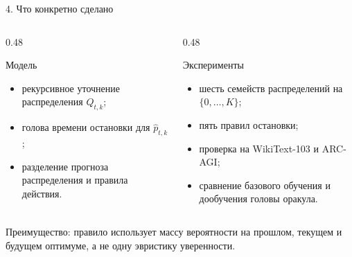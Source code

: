 \documentclass[aspectratio=169,11pt]{beamer}
\newcommand{\smallnote}[1]{{\color{mutedText}\small #1}}
\begin{document}
\begin{frame}{4. Что конкретно сделано}
\begin{columns}[T,onlytextwidth]
\begin{column}{0.48\textwidth}
\begin{block}{Модель}
\begin{itemize}\setlength\itemsep{1.5mm}
\item рекурсивное уточнение распределения $Q_{t,k}$;
\item голова времени остановки для $\widehat p_{t,k}$;
\item разделение прогноза распределения и правила действия.
\end{itemize}
\end{block}
\end{column}
\begin{column}{0.48\textwidth}
\begin{block}{Эксперименты}
\begin{itemize}\setlength\itemsep{1.5mm}
\item шесть семейств распределений на $\{0,\ldots,K\}$;
\item пять правил остановки;
\item проверка на WikiText-103 и ARC-AGI;
\item сравнение базового обучения и дообучения головы оракула.
\end{itemize}
\end{block}
\end{column}
\end{columns}

\vspace{3mm}
\smallnote{Преимущество: правило использует массу вероятности на прошлом, текущем и будущем
оптимуме, а не одну эвристику уверенности.}
\end{frame}
\end{document}
